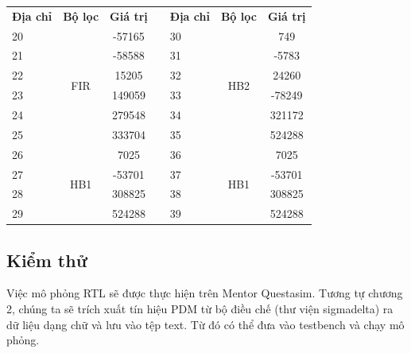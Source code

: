 \begin{table}[H]
\centering
\begin{tabular}{|l|c|c|l|l|c|c|}
\cline{1-3} \cline{5-7}
\multicolumn{1}{|c|}{\textbf{Địa chỉ}} & \textbf{Bộ lọc} & \textbf{Giá trị} &  & \multicolumn{1}{c|}{\textbf{Địa chỉ}} & \textbf{Bộ lọc} & \textbf{Giá trị} \\ \cline{1-3} \cline{5-7} 
20 & \multirow{6}{*}{FIR} & -57165 &  & 30 & \multirow{6}{*}{HB2} & 749    \\ \cline{1-1} \cline{3-3} \cline{5-5} \cline{7-7} 
21 &                      & -58588 &  & 31 &                      & -5783  \\ \cline{1-1} \cline{3-3} \cline{5-5} \cline{7-7} 
22 &                      & 15205  &  & 32 &                      & 24260  \\ \cline{1-1} \cline{3-3} \cline{5-5} \cline{7-7} 
23 &                      & 149059 &  & 33 &                      & -78249 \\ \cline{1-1} \cline{3-3} \cline{5-5} \cline{7-7} 
24 &                      & 279548 &  & 34 &                      & 321172 \\ \cline{1-1} \cline{3-3} \cline{5-5} \cline{7-7} 
25 &                      & 333704 &  & 35 &                      & 524288 \\ \cline{1-3} \cline{5-7} 
26 & \multirow{4}{*}{HB1} & 7025   &  & 36 & \multirow{4}{*}{HB1} & 7025   \\ \cline{1-1} \cline{3-3} \cline{5-5} \cline{7-7} 
27 &                      & -53701 &  & 37 &                      & -53701 \\ \cline{1-1} \cline{3-3} \cline{5-5} \cline{7-7} 
28 &                      & 308825 &  & 38 &                      & 308825 \\ \cline{1-1} \cline{3-3} \cline{5-5} \cline{7-7} 
29 &                      & 524288 &  & 39 &                      & 524288 \\ \cline{1-3} \cline{5-7} 
\end{tabular}
\end{table}

\subsection{Kiểm thử}
Việc mô phỏng RTL sẽ được thực hiện trên Mentor Questasim. Tương tự chương 2, chúng ta sẽ trích xuất tín hiệu PDM từ bộ điều chế (thư viện sigmadelta) ra dữ liệu dạng chữ và lưu vào tệp text. Từ đó có thể đưa vào testbench và chạy mô phỏng.

